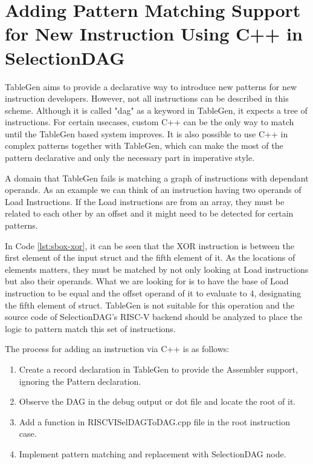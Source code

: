 \section{Adding Pattern Matching Support for New Instruction Using C++ in SelectionDAG}\label{sec:cpp}
TableGen aims to provide a declarative way to introduce new patterns for new instruction developers. However, not all instructions can be described in this scheme.  Although it is called "dag" as a keyword in TableGen, it expects a tree of instructions. For certain usecases, custom C++ can be the only way to match until the TableGen based system improves. It is also possible to use C++ in complex patterns together with TableGen, which can make the most of the pattern declarative and only the necessary part in imperative style.
\par
A domain that TableGen fails is matching a graph of instructions with dependant operands. As an example we can think of an instruction having two operands of Load Instructions. If the Load instructions are from an array, they must be related to each other by an offset and it might need to be detected for certain patterns.




In Code \ref{lst:sbox-xor}, it can be seen that the XOR instruction is between the first element of the input struct and the fifth element of it. As the locations of elements matters, they must be matched by not only looking at Load instructions but also their operands. What we are looking for is to have the base of Load instruction to be equal and the offset operand of it to evaluate to 4, designating the fifth element of struct. TableGen is not suitable for this operation and the source code of SelectionDAG's RISC-V backend should be analyzed to place the logic to pattern match this set of instructions.

The process for adding an instruction via C++ is as follows:
\begin{enumerate}
    \item Create a record declaration in TableGen to provide the Assembler support, ignoring the Pattern declaration.
    \item Observe the DAG in the debug output or dot file and locate the root of it. 
    \item Add a function in RISCVISelDAGToDAG.cpp file in the root instruction case. 
    \item Implement pattern matching and replacement with SelectionDAG node.
\end{enumerate}

